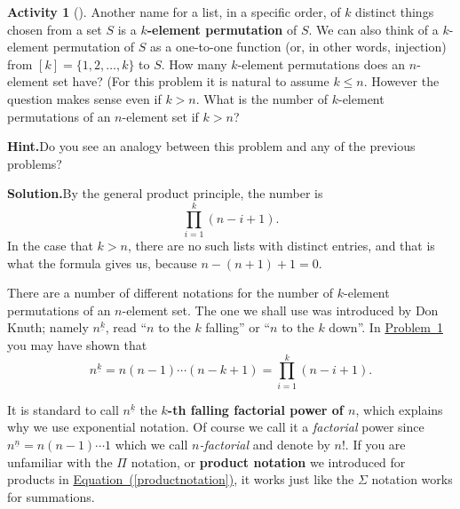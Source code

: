 \documentclass[10pt,]{book}
\newcommand{\terminology}[1]{\textbf{#1}}
\theoremstyle{plain}
\theoremstyle{definition}
\newtheorem{activity}[project]{Activity}
\numberwithin{equation}{chapter}
\begin{document}
\begin{activity}[]\label{kelementpermutation}
Another name for a list, in a specific order, of \(k\) distinct things chosen from a set \(S\) is a \terminology{\(k\)-element permutation} of \(S\). We can also think of a \(k\)-element permutation of \(S\) as a one-to-one function (or, in other words, injection) from \([k]=\{1,2,\ldots, k\}\) to \(S\). How many \(k\)-element permutations does an \(n\)-element set have? (For this problem it is natural to assume \(k\le n\). However the question makes sense even if \(k>n\). What is the number of \(k\)-element permutations of an \(n\)-element set if \(k>n\)?%
\par\medskip\noindent%
\textbf{Hint.}\quad Do you see an analogy between this problem and any of the previous problems?%
\par\medskip\noindent%
\textbf{Solution.}\quad By the general product principle, the number is%
\begin{equation*}
\prod_{i=1}^k(n-i+1).
\end{equation*}
In the case that \(k>n\), there are no such lists with distinct entries, and that is what the formula gives us, because \(n-(n+1)+1=0\).%
\end{activity}
There are a number of different notations for the number of \(k\)-element permutations of an \(n\)-element set. The one we shall use was introduced by Don Knuth; namely \(n^{\underline{k}}\), read ``\(n\) to the \(k\) falling'' or ``\(n\) to the \(k\) down''. In \hyperref[kelementpermutation]{Problem~\ref{kelementpermutation}} you may have shown that%
\begin{equation}
n^{\underline{k}} =n(n-1)\cdots (n-k+1)= \prod_{i=1}^k(
n-i+1).\label{productnotation}
\end{equation}
%
\par
It is standard to call \(n^{\underline{k}}\) the \terminology{\(k\)-th falling factorial power of \(n\)}, which explains why we use exponential notation. Of course we call it a \emph{factorial} power since \(n^{\underline{n}} = n(n-1)\cdots 1\) which we call \emph{\(n\)-factorial} and denote by \(n!\). If you are unfamiliar with the \(\Pi\) notation, or \terminology{product notation} we introduced for products in \hyperref[productnotation]{Equation~(\ref{productnotation})}, it works just like the \(\Sigma\) notation works for summations.%
\end{document}
